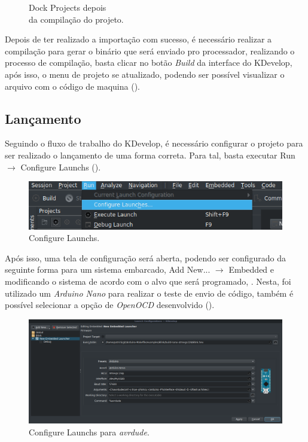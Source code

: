 \begin{figure}[!htb]
\begin{minipage}[t]{0.5\textwidth}
  \caption[Projects depois da compilação]{Dock Projects depois\\ da compilação do projeto.}
  \label{fig:projects2}
  \end{minipage}
\end{figure}

Depois de ter realizado a importação com sucesso, é necessário realizar a compilação para gerar o binário que será enviado pro processador, realizando o processo de compilação, basta clicar no botão \textit{Build} da interface do KDevelop, após isso, o menu de projeto se atualizado, podendo ser possível visualizar o arquivo com o código de maquina ().

\subsection{Lançamento}

Seguindo o fluxo de trabalho do KDevelop, é necessário configurar o projeto para ser realizado o lançamento de uma forma correta. Para tal, basta executar Run $\rightarrow$ Configure Launchs ().

\begin{figure}[!htb]
  \centering
  \includegraphics[width=1\textwidth]{figuras/run.png}
  \caption[Configure Launchs]{Configure Launchs.}
  \label{fig:run}
\end{figure}

Após isso, uma tela de configuração será aberta, podendo ser configurado da seguinte forma para um sistema embarcado, Add New... $\rightarrow$ Embedded e modificando o sistema de acordo com o alvo que será programado, . Nesta, foi utilizado um \textit{Arduino Nano} para realizar o teste de envio de código, também é possível selecionar a opção de \textit{OpenOCD} desenvolvido ().

\begin{figure}[!htb]
  \centering
  \includegraphics[width=1\textwidth]{figuras/run2.png}
  \caption[\textit{Configure Launchs} para \textit{avrdude}]{Configure Launchs para \textit{avrdude}.}
  \label{fig:run2}
\end{figure}

